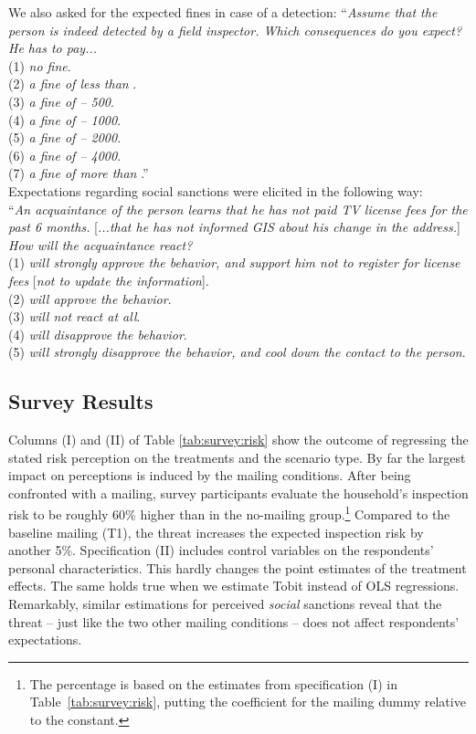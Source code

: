 \documentclass[prod,jeeabib]{jeea}
\begin{document}
\normalsize{We also asked for the expected fines in case of a detection: ``\textit{Assume that the person is indeed detected by a field inspector. Which  consequences do you expect? He has to pay...}\\
 \small{ (1) \textit{no fine}.\\
 (2) \textit{a fine of less than }.\\
 (3) \textit{a fine of  -- 500}.\\
 (4) \textit{a fine of  -- 1000}.\\
 (5) \textit{a fine of  -- 2000}.\\
 (6) \textit{a fine of  -- 4000}.\\
 (7) \textit{a fine of more than }.''} \\

\clearpage
\noindent \normalsize{Expectations regarding social sanctions were elicited in the following way:} \\
\small{``\textit{An acquaintance of the person learns that he has not paid TV license fees for the past 6 months.} [\textit{...that he has not informed GIS about his change in the address.}] \textit{How will the acquaintance react?}\\
 (1) \textit{will strongly approve the behavior, and support him not to register for license fees} [\textit{not to update the information}].\\
 (2) \textit{will approve the behavior}.\\
 (3) \textit{will not react at all}.\\
 (4) \textit{will disapprove the behavior}.\\
 (5) \textit{will strongly disapprove the behavior, and cool down the contact to the person}.}

\subsection{Survey Results}

\normalsize{Columns (I) and (II) of Table \ref{tab:survey:risk} show the outcome of regressing the stated risk perception on the treatments and the scenario type. By far the largest impact on perceptions is induced by the mailing conditions. After being confronted with a mailing, survey participants evaluate the household's inspection risk to be roughly 60\% higher than in the no-mailing group.\footnote{The percentage is based on the estimates from specification (I) in Table~\ref{tab:survey:risk}, putting the coefficient for the mailing dummy relative to the constant.} Compared to the baseline mailing (T1), the threat increases the expected inspection risk by another 5\%. Specification (II) includes control variables on the respondents' personal characteristics. This hardly changes the point estimates of the treatment effects. The same holds true when we estimate Tobit instead of OLS regressions. Remarkably, similar estimations for perceived \emph{social} sanctions reveal that the threat -- just like the two other mailing conditions -- does not affect respondents' expectations.} %

}
\end{document}
